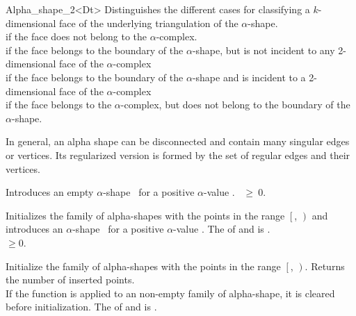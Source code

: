 \begin{ccRefClass} {Alpha_shape_2<Dt>}
{Distinguishes the different cases for classifying a $k$-dimensional face
 of the underlying triangulation of the $\alpha$-shape. \\
 if the face does not belong to the $\alpha$-complex.\\
 if the face belongs to the boundary of the $\alpha$-shape,
 but is not incident to any 2-dimensional face of the $\alpha$-complex\\
 if the face belongs to the boundary of the $\alpha$-shape
 and is incident to a 2-dimensional face of the $\alpha$-complex\\
 if the face belongs to the $\alpha$-complex, but does
not belong to the boundary of the $\alpha$-shape.\\}

{ In general, an alpha shape can be disconnected and contain many singular edges 
or vertices. Its regularized version is formed by the set of regular edges
and their vertices.}

\ccCreation
{}

{Introduces an empty $\alpha$-shape \ccVar\ for a positive $\alpha$-value
 .
\ccPrecond {}~$\geq~0$.}


{Initializes the family of alpha-shapes with the points in the range
$\left[\right.$, $\left.\right)$ and 
introduces an $\alpha$-shape \ccVar\ for a positive $\alpha$-value
.  
\ccPrecond The  of  and
 is .\\
 $\geq 0$.}

\ccOperations

{Initialize the family of alpha-shapes with the points in the range
$\left[\right.$, $\left.\right)$. Returns the number of
inserted points. \\ 
If the function is applied to an non-empty family of alpha-shape, it is cleared
before initialization.
\ccPrecond The  of  and
 is .}


\end{ccRefClass}
